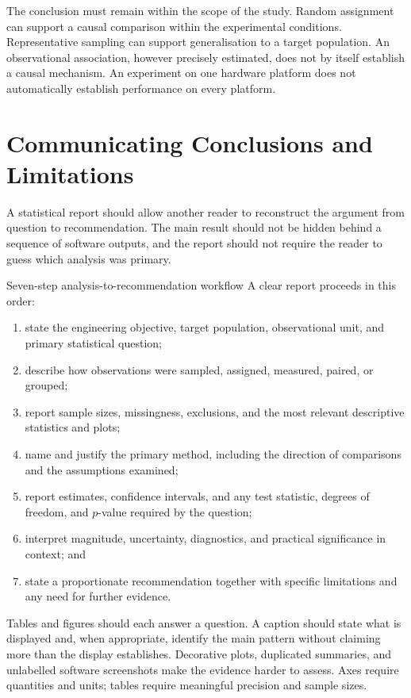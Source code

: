 The conclusion must remain within the scope of the study. Random assignment can support a causal comparison within the experimental conditions. Representative sampling can support generalisation to a target population. An observational association, however precisely estimated, does not by itself establish a causal mechanism. An experiment on one hardware platform does not automatically establish performance on every platform.

\section{Communicating Conclusions and Limitations}
\label{sec:integrated-communication}

A statistical report should allow another reader to reconstruct the argument from question to recommendation. The main result should not be hidden behind a sequence of software outputs, and the report should not require the reader to guess which analysis was primary.

\begin{custombox}{Seven-step analysis-to-recommendation workflow}
A clear report proceeds in this order:
\begin{enumerate}
  \item state the engineering objective, target population, observational unit, and primary statistical question;
  \item describe how observations were sampled, assigned, measured, paired, or grouped;
  \item report sample sizes, missingness, exclusions, and the most relevant descriptive statistics and plots;
  \item name and justify the primary method, including the direction of comparisons and the assumptions examined;
  \item report estimates, confidence intervals, and any test statistic, degrees of freedom, and $p$-value required by the question;
  \item interpret magnitude, uncertainty, diagnostics, and practical significance in context; and
  \item state a proportionate recommendation together with specific limitations and any need for further evidence.
\end{enumerate}
\end{custombox}

Tables and figures should each answer a question. A caption should state what is displayed and, when appropriate, identify the main pattern without claiming more than the display establishes. Decorative plots, duplicated summaries, and unlabelled software screenshots make the evidence harder to assess. Axes require quantities and units; tables require meaningful precision and sample sizes.

